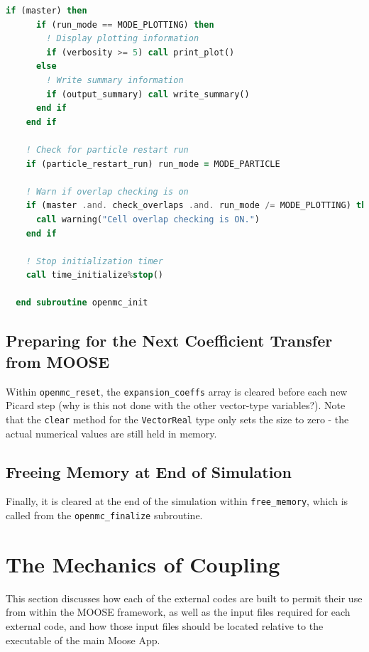 \documentclass[10pt]{article}
\numberwithin{equation}{section} %
\begin{document}
\begin{lstlisting}[language=fortran]
    if (master) then
      if (run_mode == MODE_PLOTTING) then
        ! Display plotting information
        if (verbosity >= 5) call print_plot()
      else
        ! Write summary information
        if (output_summary) call write_summary()
      end if
    end if

    ! Check for particle restart run
    if (particle_restart_run) run_mode = MODE_PARTICLE

    ! Warn if overlap checking is on
    if (master .and. check_overlaps .and. run_mode /= MODE_PLOTTING) then
      call warning("Cell overlap checking is ON.")
    end if

    ! Stop initialization timer
    call time_initialize%stop()

  end subroutine openmc_init
\end{lstlisting}








\subsection{Preparing for the Next Coefficient Transfer from MOOSE}
Within {\tt openmc\_reset}, the {\tt expansion\_coeffs} array is cleared before each new Picard step (why is this not done with the other vector-type variables?). Note that the {\tt clear} method for the {\tt VectorReal} type only sets the size to zero - the actual numerical values are still held in memory. 

\subsection{Freeing Memory at End of Simulation}
Finally, it is cleared at the end of the simulation within {\tt free\_memory}, which is called from the {\tt openmc\_finalize} subroutine.








\section{The Mechanics of Coupling}
This section discusses how each of the external codes are built to permit their use from within the MOOSE framework, as well as the input files required for each external code, and how those input files should be located relative to the executable of the main Moose App.
\end{document}
